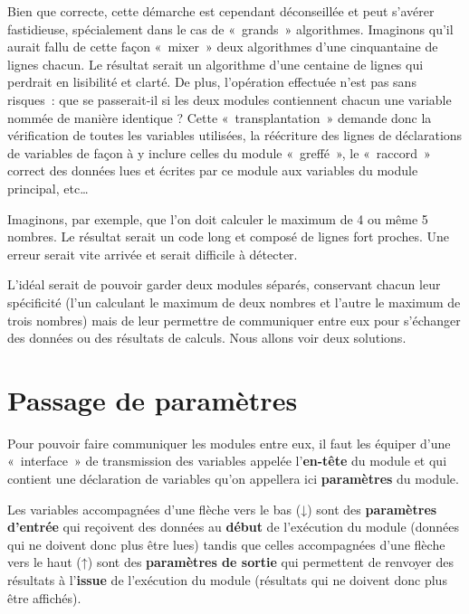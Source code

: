 
	Bien que correcte, cette démarche est cependant déconseillée et peut
	s’avérer fastidieuse, spécialement dans le cas de «~grands~»
	algorithmes. Imaginons qu’il aurait fallu de cette façon «~mixer~» deux
	algorithmes d’une cinquantaine de lignes chacun. Le résultat serait un
	algorithme d’une centaine de lignes qui perdrait en lisibilité et
	clarté. De plus, l’opération effectuée n’est pas sans risques~: que se
	passerait-il si les deux modules contiennent chacun une variable nommée
	de manière identique ? Cette «~transplantation~» demande donc la
	vérification de toutes les variables utilisées, la réécriture des
	lignes de déclarations de variables de façon à y inclure celles du
	module «~greffé~», le «~raccord~» correct des données lues et écrites
	par ce module aux variables du module principal, etc… 
	
	Imaginons, par exemple, que l'on doit calculer le
	maximum de 4 ou même 5 nombres. Le résultat serait un code long et
	composé de lignes fort proches. Une erreur serait vite arrivée et
	serait difficile à détecter.
	
	L’idéal serait de pouvoir garder deux modules séparés, conservant chacun
	leur spécificité (l’un calculant le maximum de deux nombres et l’autre
	le maximum de trois nombres) mais de leur permettre de communiquer
	entre eux pour s’échanger des données ou des résultats de calculs. Nous
	allons voir deux solutions.

\section{Passage de paramètres}

	Pour pouvoir faire communiquer les modules entre eux, il faut les
	équiper d’une «~interface~» de transmission des variables appelée
	l’\textbf{en-tête }du module et qui contient une déclaration de
	variables qu’on appellera ici \textbf{paramètres} du module. 
	
	Les variables accompagnées d’une flèche vers le bas (\textsf{↓}) sont
	des \textbf{paramètres d’entrée} qui reçoivent des données au
	\textbf{début} de l’exécution du module (données qui ne doivent donc
	plus être lues) tandis que celles accompagnées d’une flèche vers le
	haut (\textsf{↑}) sont des \textbf{paramètres de sortie} qui permettent
	de renvoyer des résultats à l’\textbf{issue} de l’exécution du module
	(résultats qui ne doivent donc plus être affichés). 

